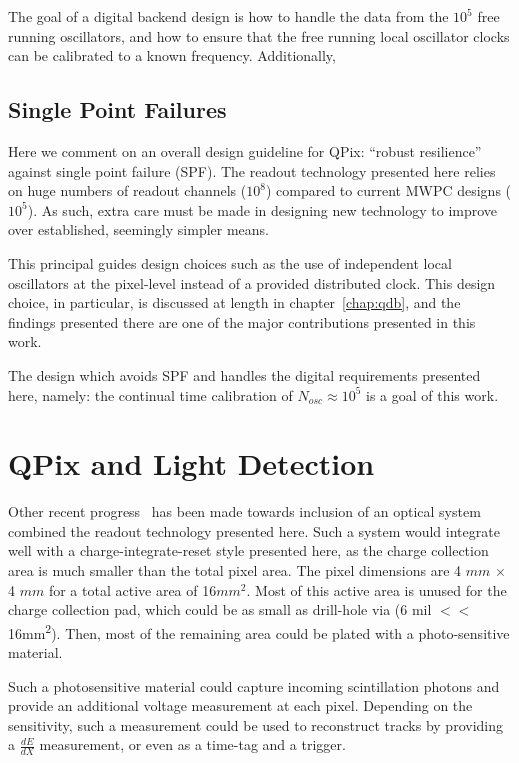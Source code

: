 The goal of a digital backend design is how to handle the data from the $10^{5}$ free running oscillators, and how to ensure that the free running local oscillator clocks can be calibrated to a known frequency.
Additionally,

\subsection{Single Point Failures}

Here we comment on an overall design guideline for QPix: ``robust resilience'' against single point failure (SPF).
The readout technology presented here relies on huge numbers of readout channels ($10^{8}$) compared to current MWPC designs ($10^{5}$).
As such, extra care must be made in designing new technology to improve over established, seemingly simpler means.

This principal guides design choices such as the use of independent local oscillators at the pixel-level instead of a provided distributed clock.
This design choice, in particular, is discussed at length in chapter~\ref{chap:qdb}, and the findings presented there are one of the major contributions presented in this work.

The design which avoids SPF and handles the digital requirements presented here, namely: the continual time calibration of $N_{osc} \approx 10^{5}$ is a goal of this work.

\section{QPix and Light Detection}

Other recent progress~\citep{https://doi.org/10.48550/arxiv.2207.11127} has been made towards inclusion of an optical system combined the readout technology presented here.
Such a system would integrate well with a charge-integrate-reset style presented here, as the charge collection area is much smaller than the total pixel area.
The pixel dimensions are 4 $\unit{mm}$ $\times$ 4 $\unit{mm} $ for a total active area of 16$\unit{mm^{2}}$.
Most of this active area is unused for the charge collection pad, which could be as small as drill-hole via (6 mil $<<$ 16\unit{mm^2}).
Then, most of the remaining area could be plated with a photo-sensitive material.

Such a photosensitive material could capture incoming scintillation photons and provide an additional voltage measurement at each pixel.
Depending on the sensitivity, such a measurement could be used to reconstruct tracks by providing a $\frac{dE}{dX}$ measurement, or even as a time-tag and a trigger.

